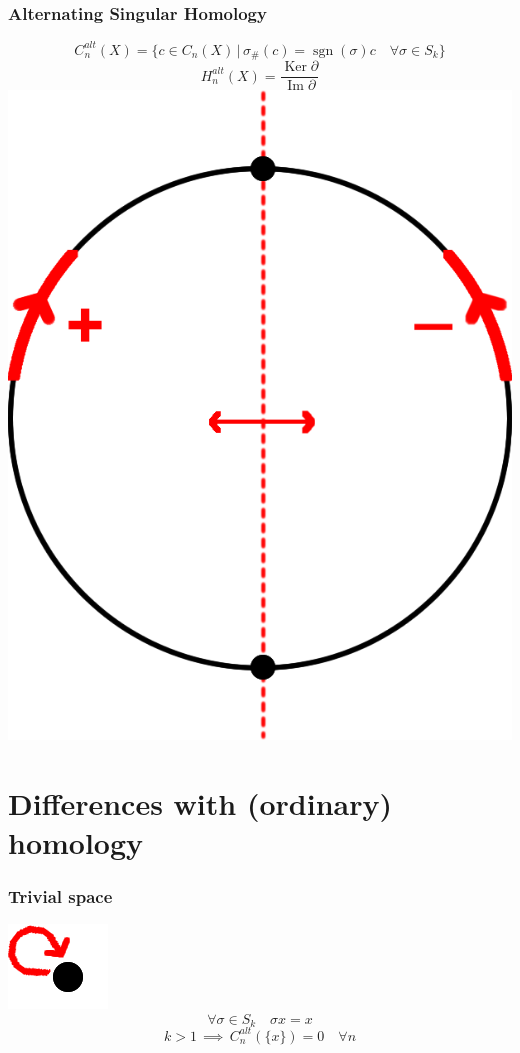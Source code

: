 \documentclass{beamer}[10pt]
\DeclareMathOperator{\Ima}{Im}
\DeclareMathOperator{\Ker}{Ker}
\DeclareMathOperator{\sgn}{sgn}
\theoremstyle{definition}
\begin{document}
\begin{frame}
\frametitle{Alternating Singular Homology}
\centering
$$C^{alt}_n(X)=\{c\in C_n(X) \,| \,\sigma_\#(c)\!=\!\sgn(\sigma)c\quad\forall\sigma\in S_k\}$$
$$H_n^{alt}(X)=\frac{\Ker\partial}{\Ima\partial}$$
\vspace{3mm}
\includegraphics[scale=0.15]{Alternating1Chain.png}
\end{frame}


\section{Differences with (ordinary) homology}

\begin{frame}
\frametitle{Trivial space}
\centering
\includegraphics[scale=0.2]{trivialSpace.png}
$$\forall \sigma\in S_k\quad\sigma x=x$$
$$k>1\,\implies\,C_n^{alt}(\{x\})=0\quad \forall n$$
\end{frame}
\end{document}
